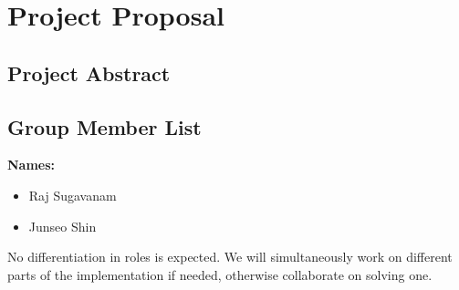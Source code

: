 \documentclass[12pt]{article}
\begin{document}
{\section*{Project Proposal}}

{\subsection*{Project Abstract}}


{\subsection*{Group Member List}}

\textbf{Names:}
\begin{itemize}
    \item Raj Sugavanam
    \item Junseo Shin
\end{itemize}

No differentiation in roles is expected. We will simultaneously work on
different parts of the implementation if needed, otherwise collaborate on
solving one.
\end{document}

